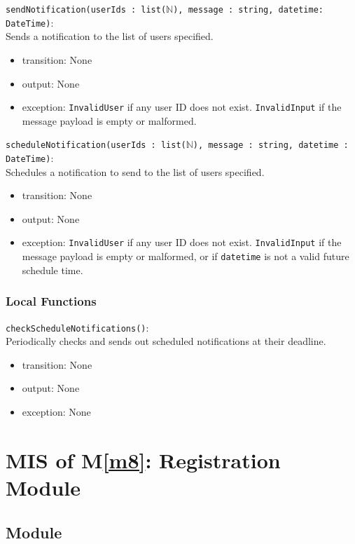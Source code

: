\documentclass[12pt, titlepage]{article}
\begin{document}
\noindent \texttt{sendNotification(userIds : list($\mathbb{N}$), message : string, \newline datetime: DateTime)}: \\
Sends a notification to the list of users specified.
\begin{itemize}
\item transition: None
\item output: None
\item exception: \texttt{InvalidUser} if any user ID does not exist. \texttt{InvalidInput} if the message payload is empty or malformed.
\end{itemize}

\noindent \texttt{scheduleNotification(userIds : list($\mathbb{N}$), message : string, \newline datetime : DateTime)}: \\
Schedules a notification to send to the list of users specified.
\begin{itemize}
\item transition: None
\item output: None
\item exception: \texttt{InvalidUser} if any user ID does not exist. \texttt{InvalidInput} if the message payload is empty or malformed, or if \texttt{datetime} is not a valid future schedule time.
\end{itemize}

\subsubsection{Local Functions}

\noindent \texttt{checkScheduleNotifications()}: \\
Periodically checks and sends out scheduled notifications at their deadline.
\begin{itemize}
\item transition: None
\item output: None
\item exception: None
\end{itemize}

\newpage

\section{MIS of M\ref{m8}: Registration Module}

\subsection{Module}
\end{document}
